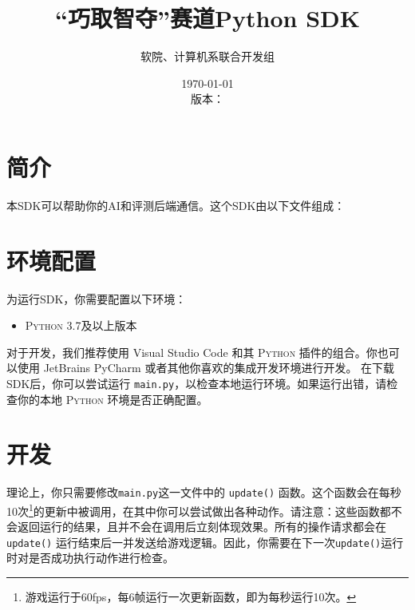 \documentclass{article}
\title{“巧取智夺”赛道Python SDK}
\author{软院、计算机系联合开发组}
\date{\today\\版本：\gitAbbrevHash}
\begin{document}
\maketitle

\section{简介}

本SDK可以帮助你的AI和评测后端通信。这个SDK由以下文件组成：


\section{环境配置}

为运行SDK，你需要配置以下环境：
	\begin{itemize}\setlength\itemsep{0em}
		\item \textsc{Python} 3.7及以上版本
	\end{itemize}
	对于开发，我们推荐使用 Visual Studio Code 和其 \textsc{Python} 插件的组合。你也可以使用 JetBrains PyCharm 或者其他你喜欢的集成开发环境进行开发。
	在下载SDK后，你可以尝试运行 \texttt{main.py}，以检查本地运行环境。如果运行出错，请检查你的本地 \textsc{Python} 环境是否正确配置。

\section{开发}

理论上，你只需要修改\texttt{main.py}这一文件中的 \texttt{update()} 函数。这个函数会在每秒10次\footnote{游戏运行于60fps，每6帧运行一次更新函数，即为每秒运行10次。}的更新中被调用，在其中你可以尝试做出各种动作。请注意：这些函数都不会返回运行的结果，且并不会在调用后立刻体现效果。所有的操作请求都会在 \texttt{update()} 运行结束后一并发送给游戏逻辑。因此，你需要在下一次\texttt{update()}运行时对是否成功执行动作进行检查。
\end{document}

